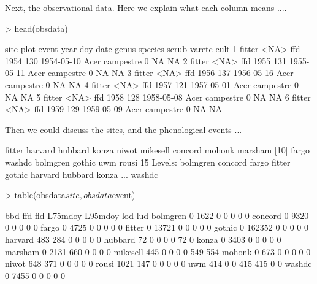 \documentclass{article}
\begin{document}
Next, the observational data. Here we explain what each column means ....

\begin{Schunk}
\begin{Sinput}
> head(obsdata)
\end{Sinput}
\begin{Soutput}
    site plot event year doy       date genus   species scrub varetc cult
1 fitter <NA>   ffd 1954 130 1954-05-10  Acer campestre     0     NA   NA
2 fitter <NA>   ffd 1955 131 1955-05-11  Acer campestre     0     NA   NA
3 fitter <NA>   ffd 1956 137 1956-05-16  Acer campestre     0     NA   NA
4 fitter <NA>   ffd 1957 121 1957-05-01  Acer campestre     0     NA   NA
5 fitter <NA>   ffd 1958 128 1958-05-08  Acer campestre     0     NA   NA
6 fitter <NA>   ffd 1959 129 1959-05-09  Acer campestre     0     NA   NA
\end{Soutput}
\end{Schunk}

Then we could discuss the sites, and the phenological events ...

\begin{Schunk}
\begin{Soutput}
 [1] fitter   harvard  hubbard  konza    niwot    mikesell concord  mohonk   marsham 
[10] fargo    washdc   bolmgren gothic   uwm      rousi   
15 Levels: bolmgren concord fargo fitter gothic harvard hubbard konza ... washdc
\end{Soutput}
\end{Schunk}

\begin{Schunk}
\begin{Sinput}
> table(obsdata$site, obsdata$event)
\end{Sinput}
\begin{Soutput}
              bbd    ffd    fld L75mdoy L95mdoy    lod    lud
  bolmgren      0   1622      0       0       0      0      0
  concord       0   9320      0       0       0      0      0
  fargo         0   4725      0       0       0      0      0
  fitter        0  13721      0       0       0      0      0
  gothic        0 162352      0       0       0      0      0
  harvard     483    284      0       0       0      0      0
  hubbard      72      0      0       0       0     72      0
  konza         0   3403      0       0       0      0      0
  marsham       0   2131    660       0       0      0      0
  mikesell    445      0      0       0       0    549    554
  mohonk        0    673      0       0       0      0      0
  niwot       648    371      0       0       0      0      0
  rousi      1021    147      0       0       0      0      0
  uwm         414      0      0     415     415      0      0
  washdc        0   7455      0       0       0      0      0
\end{Soutput}
\end{Schunk}
\end{document}
